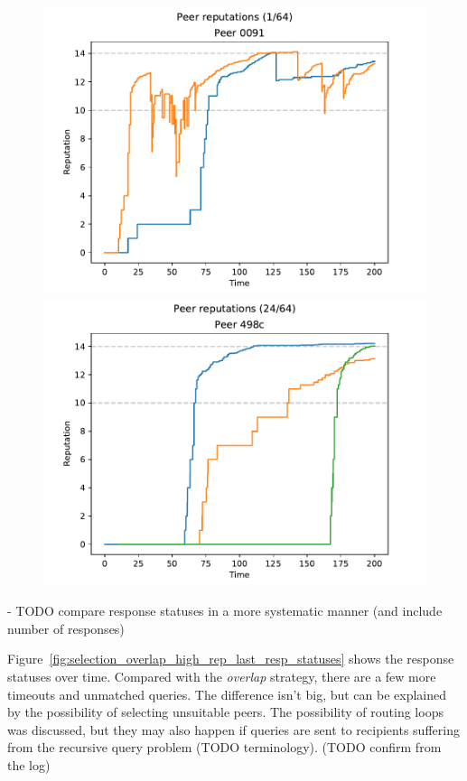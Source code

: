 \begin{figure}[t]
\centering
\includegraphics[width=0.5\columnwidth]{figures/selection_overlap_high_rep_last_peer_reps_1_of_64}%
\includegraphics[width=0.5\columnwidth]{figures/selection_overlap_high_rep_last_peer_reps_24_of_64}
\label{fig:selection_overlap_high_rep_last_peer_reps}
\end{figure}

- TODO compare response statuses in a more systematic manner (and include number
  of responses)

Figure~\ref{fig:selection_overlap_high_rep_last_resp_statuses} shows the
response statuses over time. Compared with the \emph{overlap} strategy, there
are a few more timeouts and unmatched queries. The difference isn't big, but can
be explained by the possibility of selecting unsuitable peers. The possibility
of routing loops was discussed, but they may also happen if queries are sent to
recipients suffering from the recursive query problem (TODO terminology). (TODO
confirm from the log)

